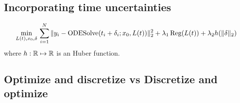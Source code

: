\subsection{Incorporating time uncertainties}

\begin{equation}
 \min_{L(t), x_0, \delta} \,
 \sum_{i=1}^N \| y_i - \operatorname{\text{ODESolve}} (t_i + \delta_i; x_0, L(t)) \|_2^2
 + 
 \lambda_1 
 \operatorname{\text{Reg}} (L(t))
 + 
 \lambda_2 
 h(\| \delta \|_2)
\end{equation}
where $h:\operatorname{\mathbb{R}} \mapsto \operatorname{\mathbb{R}}$ is an Huber function.

\subsection{Optimize and discretize vs Discretize and optimize}

